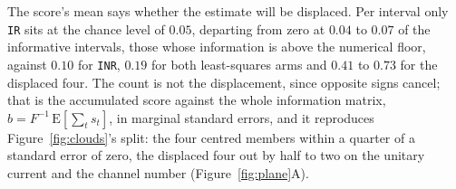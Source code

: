 The score's mean says whether the estimate will be displaced. Per interval only \texttt{IR} sits at
the chance level of $0.05$, departing from zero at $0.04$ to $0.07$ of the informative intervals,
those whose information is above the numerical floor, against $0.10$ for \texttt{INR}, $0.19$ for
both least-squares arms and $0.41$ to $0.73$ for the displaced four. The count is not the
displacement, since opposite signs cancel; that is the accumulated score against the whole
information matrix, $b = F^{-1}\,\mathrm{E}[\sum_t s_t]$, in marginal standard errors, and it
reproduces Figure~\ref{fig:clouds}'s split: the four centred members within a quarter of a standard
error of zero, the displaced four out by half to two on the unitary current and the channel number
(Figure~\ref{fig:plane}A).
